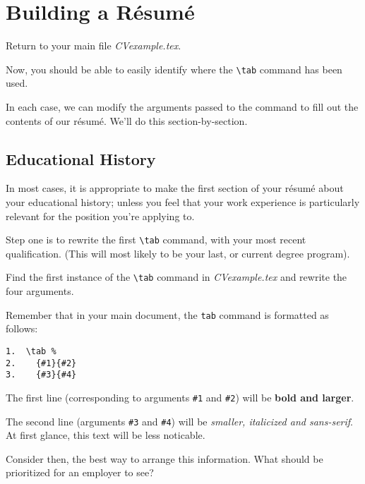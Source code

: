 \section{Building a R\'esum\'e}
Return to your main file \emph{CVexample.tex}. \par

Now, you should be able to easily identify where the \lstinline|\tab| command has been used. \par

In each case, we can modify the arguments passed to the command to fill out the contents of our r\'esum\'e. We'll do this section-by-section. \par

\subsection{Educational History}
In most cases, it is appropriate to make the first section of your r\'esum\'e about your educational history; unless you feel that your work experience is particularly relevant for the position you're applying to. \par

Step one is to rewrite the first \lstinline|\tab| command, with your most recent qualification. (This will most likely to be your last, or current degree program). \par

\begin{instrct}
Find the first instance of the \lstinline|\tab| command in \emph{CVexample.tex} and rewrite the four arguments. 
\end{instrct}

Remember that in your main document, the \lstinline|tab| command is formatted as follows: \par

\begin{lstlisting}
1.  \tab %
2.    {#1}{#2}
3.    {#3}{#4}
\end{lstlisting}

The first line (corresponding to arguments \lstinline|#1| and \lstinline|#2|) will be \textbf{bold and larger}. \par

The second line (arguments \lstinline|#3| and \lstinline|#4|) will be {\footnotesize{\textit{\sffamily smaller, italicized and sans-serif}}}. At first glance, this text will be less noticable. \par

Consider then, the best way to arrange this information. What should be prioritized for an employer to see? \par


